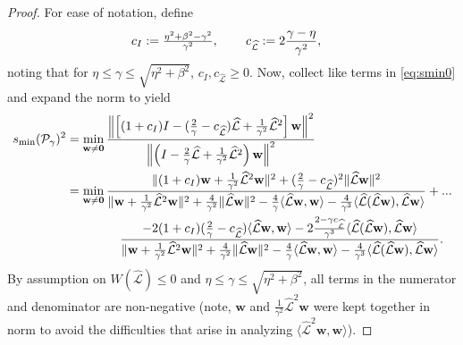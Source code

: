 \documentclass[review]{siamart}
\begin{document}
\begin{proof}
For ease of notation, define
%
\begin{align*}
c_I & := \tfrac{\eta^2+\beta^2-\gamma^2}{\gamma^2} , \hspace{5ex}
c_{\widehat{\mathcal{L}}} := 2\frac{\gamma-\eta}{\gamma^2},
\end{align*}
%
noting that for $\eta\leq\gamma\leq\sqrt{\eta^2+\beta^2}$, $c_I,c_{\widehat{\mathcal{L}}} \geq 0$.
Now, collect like terms in \eqref{eq:smin0} and expand the norm to yield
%
\begin{align}\nonumber
s_{\min}(\mathcal{P}_\gamma)^2
& = \min_{\mathbf{w}\neq\mathbf{0}}
	\frac{\left\| \left[(1+c_I)I - (\tfrac{2}{\gamma}-c_{\widehat{\mathcal{L}}})\widehat{\mathcal{L}} +
		\tfrac{1}{\gamma^2}\widehat{\mathcal{L}}^2\right]\mathbf{w} \right\|^2}
	{\left\|\left(I - \tfrac{2}{\gamma}\widehat{\mathcal{L}} +
		\tfrac{1}{\gamma^2}\widehat{\mathcal{L}}^2\right)\mathbf{w} \right\|^2} \\
& =  \min_{\mathbf{w}\neq\mathbf{0}}
	\frac{\|(1+c_I)\mathbf{w}+\tfrac{1}{\gamma^2}\widehat{\mathcal{L}}^2\mathbf{w}\|^2 +
		(\tfrac{2}{\gamma}-c_{\widehat{\mathcal{L}}})^2\|\widehat{\mathcal{L}}\mathbf{w}\|^2}
	{\|\mathbf{w}+\tfrac{1}{\gamma^2}\widehat{\mathcal{L}}^2\mathbf{w}\|^2 +
		\tfrac{4}{\gamma^2}\|\widehat{\mathcal{L}}\mathbf{w}\|^2 -
		\tfrac{4}{\gamma}\langle\widehat{\mathcal{L}}\mathbf{w},\mathbf{w}\rangle -
		\tfrac{4}{\gamma^3}\langle\widehat{\mathcal{L}}(\widehat{\mathcal{L}}\mathbf{w}),\widehat{\mathcal{L}}\mathbf{w}\rangle} + ... \nonumber\\
& \hspace{10ex} \frac{-2(1+c_I)(\tfrac{2}{\gamma}-c_{\widehat{\mathcal{L}}})
	\langle\widehat{\mathcal{L}}\mathbf{w},\mathbf{w}\rangle -
		2\tfrac{2-\gamma c_{\widehat{\mathcal{L}}}}{\gamma^3}
		\langle\widehat{\mathcal{L}}(\widehat{\mathcal{L}}\mathbf{w}),
			\widehat{\mathcal{L}}\mathbf{w}\rangle}
	{\|\mathbf{w}+\tfrac{1}{\gamma^2}\widehat{\mathcal{L}}^2\mathbf{w}\|^2 +
		\tfrac{4}{\gamma^2}\|\widehat{\mathcal{L}}\mathbf{w}\|^2 -
		\tfrac{4}{\gamma}\langle\widehat{\mathcal{L}}\mathbf{w},\mathbf{w}\rangle -
		\tfrac{4}{\gamma^3}\langle\widehat{\mathcal{L}}(\widehat{\mathcal{L}}\mathbf{w}),\widehat{\mathcal{L}}\mathbf{w}\rangle}.\label{eq:smin_ex}
\end{align}
%
By assumption on $W(\widehat{\mathcal{L}})\leq 0$ and $\eta\leq\gamma\leq\sqrt{\eta^2+\beta^2}$,
all terms in the numerator and denominator are non-negative (note, $\mathbf{w}$ and
$\tfrac{1}{\gamma^2}\widehat{\mathcal{L}}^2\mathbf{w}$ were kept together in norm to avoid
the difficulties that arise in analyzing $\langle\widehat{\mathcal{L}}^2\mathbf{w},\mathbf{w}\rangle$).

\end{proof}
\end{document}
